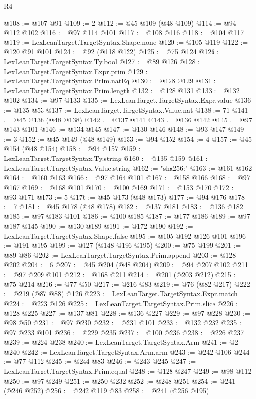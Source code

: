 \begin{lexlean}{R4}
\begin{coremodule}
@108 := @107 @91
@109 := 2
@112 := @45 @109 (@48 @109)
@114 := @94 @112 @102
@116 := @97 @114 @101
@117 := @108 @116
@118 := @104 @117
@119 := LexLeanTarget.TargetSyntax.Shape.none
@120 := @105 @119
@122 := @120 @91 @101
@124 := @92 (@118 @122)
@125 := @75 @124
@126 := LexLeanTarget.TargetSyntax.Ty.bool
@127 := @89 @126
@128 := LexLeanTarget.TargetSyntax.Expr.prim
@129 := LexLeanTarget.TargetSyntax.Prim.natEq
@130 := @128 @129
@131 := LexLeanTarget.TargetSyntax.Prim.length
@132 := @128 @131
@133 := @132 @102
@134 := @97 @133
@135 := LexLeanTarget.TargetSyntax.Expr.value
@136 := @135 @53
@137 := LexLeanTarget.TargetSyntax.Value.nat
@138 := 71
@141 := @45 @138 (@48 @138)
@142 := @137 @141
@143 := @136 @142
@145 := @97 @143 @101
@146 := @134 @145
@147 := @130 @146
@148 := @93 @147
@149 := 3
@152 := @45 @149 (@48 @149)
@153 := @94 @152
@154 := 4
@157 := @45 @154 (@48 @154)
@158 := @94 @157
@159 := LexLeanTarget.TargetSyntax.Ty.string
@160 := @135 @159
@161 := LexLeanTarget.TargetSyntax.Value.string
@162 := "sha256:"
@163 := @161 @162
@164 := @160 @163
@166 := @97 @164 @101
@167 := @158 @166
@168 := @97 @167
@169 := @168 @101
@170 := @100 @169
@171 := @153 @170
@172 := @93 @171
@173 := 5
@176 := @45 @173 (@48 @173)
@177 := @94 @176
@178 := 7
@181 := @45 @178 (@48 @178)
@182 := @137 @181
@183 := @136 @182
@185 := @97 @183 @101
@186 := @100 @185
@187 := @177 @186
@189 := @97 @187 @145
@190 := @130 @189
@191 := @172 @190
@192 := LexLeanTarget.TargetSyntax.Shape.false
@195 := @105 @192 @126 @101
@196 := @191 @195
@199 := @127 (@148 @196 @195)
@200 := @75 @199
@201 := @89 @86
@202 := LexLeanTarget.TargetSyntax.Prim.append
@203 := @128 @202
@204 := 6
@207 := @45 @204 (@48 @204)
@209 := @94 @207 @102
@211 := @97 @209 @101
@212 := @168 @211
@214 := @201 (@203 @212)
@215 := @75 @214
@216 := @77 @50
@217 := @216 @83
@219 := @76 (@82 @217)
@222 := @219 (@87 @88) @126
@223 := LexLeanTarget.TargetSyntax.Expr.match
@224 := @223 @126
@225 := LexLeanTarget.TargetSyntax.Prim.slice
@226 := @128 @225
@227 := @137 @81
@228 := @136 @227
@229 := @97 @228
@230 := @98 @50
@231 := @97 @230
@232 := @231 @101
@233 := @132 @232
@235 := @97 @233 @101
@236 := @229 @235
@237 := @100 @236
@238 := @226 @237
@239 := @224 @238
@240 := LexLeanTarget.TargetSyntax.Arm
@241 := @2 @240
@242 := LexLeanTarget.TargetSyntax.Arm.arm
@243 := @242 @106
@244 := @77 @112
@245 := @244 @83
@246 := @243 @245
@247 := LexLeanTarget.TargetSyntax.Prim.equal
@248 := @128 @247
@249 := @98 @112
@250 := @97 @249
@251 := @250 @232
@252 := @248 @251
@254 := @241 (@246 @252)
@256 := @242 @119 @83
@258 := @241 (@256 @195)

\end{coremodule}
\end{lexlean}
